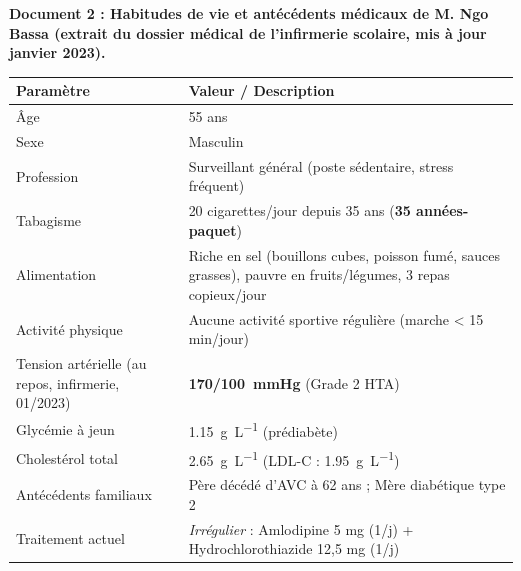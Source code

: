 \documentclass[11pt]{article}
\begin{document}
\medskip
\noindent \textbf{Document 2 : Habitudes de vie et antécédents médicaux de M. Ngo Bassa (extrait du dossier médical de l'infirmerie scolaire, mis à jour janvier 2023).}
\begin{center}
\begin{tabularx}{\linewidth}{|l|X|}\hline
\rowcolor{popblueL} \textbf{Paramètre} & \textbf{Valeur / Description} \\ \hline
Âge & 55 ans \\ \hline
Sexe & Masculin \\ \hline
Profession & Surveillant général (poste sédentaire, stress fréquent) \\ \hline
Tabagisme & 20 cigarettes/jour depuis 35 ans (\textbf{35 années-paquet}) \\ \hline
Alimentation & Riche en sel (bouillons cubes, poisson fumé, sauces grasses), pauvre en fruits/légumes, 3 repas copieux/jour \\ \hline
Activité physique & Aucune activité sportive régulière (marche < 15 min/jour) \\ \hline
Tension artérielle (au repos, infirmerie, 01/2023) & \textbf{\SI{170/100}{\mmHg}} (Grade 2 HTA) \\ \hline
Glycémie à jeun & \SI{1,15}{\g\per\L} (prédiabète) \\ \hline
Cholestérol total & \SI{2,65}{\g\per\L} (LDL-C : \SI{1,95}{\g\per\L}) \\ \hline
Antécédents familiaux & Père décédé d'AVC à 62 ans ; Mère diabétique type 2 \\ \hline
Traitement actuel & \emph{Irrégulier} : Amlodipine 5 mg (1/j) + Hydrochlorothiazide 12,5 mg (1/j) \\ \hline
\end{tabularx}
\end{center}
\end{document}
